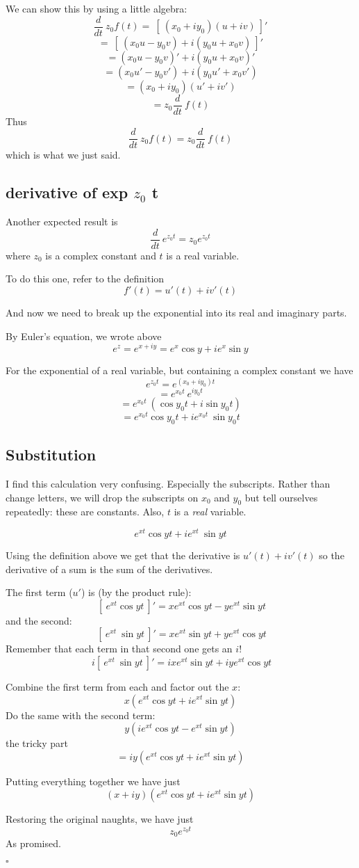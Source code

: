 \documentclass[11pt, oneside]{article}
\begin{document}
We can show this by using a little algebra:
\[ \frac{d}{dt} \ z_0 f(t) = \ [ \ (x_0 + i y_0) (u + iv) \ ]' \]
\[ = \ [ \ (x_0 u - y_0 v) + i (y_0 u + x_0 v) \ ]' \]
\[ = (x_0 u - y_0 v)' + i (y_0 u + x_0 v)' \]
\[ = (x_0 u' - y_0 v') + i (y_0 u' + x_0 v') \]
\[ = (x_0 + i y_0)(u' + iv') \]
\[ = z_0 \frac{d}{dt} \ f(t) \]
Thus
\[ \frac{d}{dt} \ z_0 f(t) = z_0 \frac{d}{dt} \ f(t) \]
which is what we just said.

\subsection*{derivative of exp $z_0$ t }

Another expected result is
\[ \frac{d}{dt} \ e^{z_0 t} = z_0 e^{z_0 t} \]
where $z_0$ is a complex constant and $t$ is a real variable.

To do this one, refer to the definition
\[ f'(t) = u'(t) + i v'(t) \]

And now we need to break up the exponential into its real and imaginary parts.  

By Euler's equation, we wrote above
\[ e^z = e^{x + iy} = e^x \cos y + i e^x \sin y \]

For the exponential of a real variable, but containing a complex constant we have
\[ e^{z_0 t} = e^{(x_0 + iy_0) t} \]
\[ = e^{x_0t} \ e^{i y_0 t} \]
\[ = e^{x_0t} \ (\cos y_0 t + i \sin y_0 t) \]
\[ = e^{x_0t} \cos y_0 t + i e^{x_0t} \ \sin y_0 t \]

\subsection*{Substitution}

I find this calculation very confusing.  Especially the subscripts.  Rather than change letters, we will drop the subscripts on $x_0$ and $y_0$ but tell ourselves repeatedly:  these are constants.  Also, $t$ is a \emph{real} variable.

\[ e^{xt} \cos y t + i e^{xt} \ \sin yt \]

Using the definition above we get that the derivative is $u'(t) + i v'(t)$ so the derivative of a sum is the sum of the derivatives.

The first term ($u'$) is (by the product rule):
\[ \ [ \ e^{xt} \cos y t \ ]' = x e^{xt} \cos yt  - y e^{xt} \sin yt \]
and the second:
\[ \ [ \ e^{xt} \ \sin yt \ ]' =  x e^{xt} \sin yt  + y e^{xt} \cos yt \]
Remember that each term in that second one gets an $i$!
\[ \ i[ \ e^{xt} \ \sin yt \ ]' =  ix e^{xt} \sin yt  + iy e^{xt} \cos yt \]

Combine the first term from each and factor out the $x$:
\[ x(e^{xt} \cos yt +  ie^{xt} \sin yt) \]
Do the same with the second term:
\[ y(ie^{xt} \cos yt - e^{xt} \sin yt) \]
the tricky part
\[ = iy(e^{xt} \cos yt + ie^{xt} \sin yt) \]

Putting everything together we have just
\[ (x + iy)(e^{xt} \cos yt + ie^{xt} \sin yt) \]

Restoring the original naughts, we have just
\[ z_0 e^{z_0 t} \]
As promised.

$\square$
\end{document}
